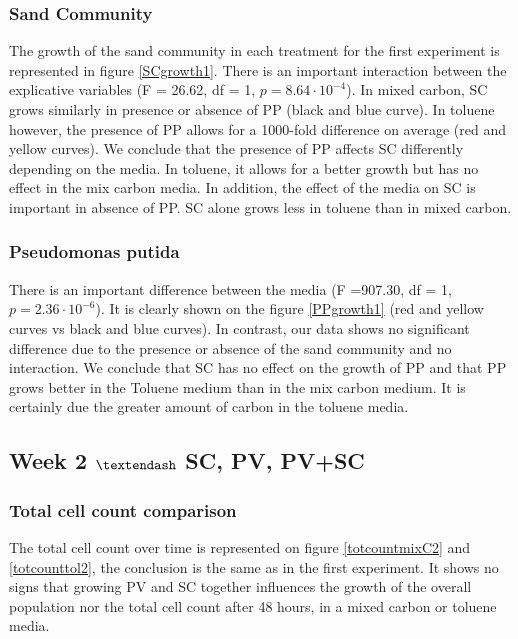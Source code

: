 \documentclass[a4paper, 10pt, conference]{ieeeconf}   %
\begin{document}
\subsubsection{Sand Community}
The growth of the sand community in each treatment for the first experiment is represented in figure \ref{SCgrowth1}.
There is an important interaction between the explicative variables (F = 26.62, df = 1, $p = 8.64\cdot 10 ^{-4}$).
In mixed carbon, SC grows similarly in presence or absence of PP (black and blue curve).
In toluene however, the presence of PP allows for a 1000-fold difference on average (red and yellow curves).
We conclude that the presence of PP affects SC differently depending on the media. In toluene, it allows for a better growth but has no effect in the mix carbon media. In addition, the effect of the media on SC is important in absence of PP. SC alone grows less in toluene than in mixed carbon.\newline

\subsubsection{Pseudomonas putida}
There is an important difference between the media (F =907.30, df = 1, $p = 2.36 \cdot 10^{-6}$). It is clearly shown on the figure \ref{PPgrowth1} (red and yellow curves vs black and blue curves).
In contrast, our data shows no significant difference due to the presence or absence of the sand community and no interaction.
We conclude that SC has no effect on the growth of PP and that PP grows better in the Toluene medium than in the mix carbon medium. It is certainly due the greater amount of carbon in the toluene media.



\subsection{Week 2 $\textendash$ SC, PV, PV+SC}

\subsubsection{Total cell count comparison}
The total cell count over time is represented on figure \ref{totcountmixC2} and \ref{totcounttol2}, the conclusion is the same as in the first experiment. It shows no signs that growing PV and SC together influences the growth of the overall population nor the total cell count after 48 hours, in a mixed carbon or toluene media.\newline
\end{document}
